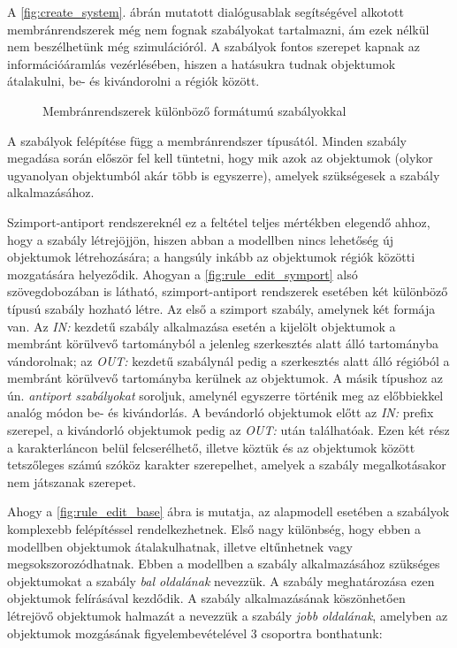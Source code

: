 A \ref{fig:create_system}. ábrán mutatott dialógusablak segítségével alkotott membránrendszerek még nem fognak szabályokat tartalmazni, ám ezek nélkül nem beszélhetünk még szimulációról.  A szabályok fontos szerepet kapnak az információáramlás vezérlésében, hiszen a hatásukra tudnak objektumok átalakulni, be- és kivándorolni a régiók között. 

\begin{figure}[H]
	\centering
	\vspace{5pt}
	\caption{Membránrendszerek különböző formátumú szabályokkal}
	\label{fig:rule_edits}
\end{figure}

 A szabályok felépítése függ a membránrendszer típusától. Minden szabály megadása során először fel kell tüntetni, hogy mik azok az objektumok (olykor ugyanolyan objektumból akár több is egyszerre), amelyek szükségesek a szabály alkalmazásához. 

Szimport-antiport rendszereknél ez a feltétel teljes mértékben elegendő ahhoz, hogy a szabály létrejöjjön, hiszen abban a modellben nincs lehetőség új objektumok létrehozására; a hangsúly inkább az objektumok régiók közötti mozgatására helyeződik. Ahogyan a \ref{fig:rule_edit_symport} alsó szövegdobozában is látható, szimport-antiport rendszerek esetében két különböző típusú szabály hozható létre. Az első a szimport szabály, amelynek két formája van. Az \textit{IN:} kezdetű szabály alkalmazása esetén a kijelölt objektumok a membránt körülvevő tartományból a jelenleg szerkesztés alatt álló tartományba vándorolnak; az \textit{OUT:} kezdetű szabálynál pedig a szerkesztés alatt álló régióból a membránt körülvevő tartományba kerülnek az objektumok. A másik típushoz az ún. \textit{antiport szabályokat}  soroljuk, amelynél egyszerre történik meg az előbbiekkel analóg módon be- és kivándorlás. A bevándorló objektumok előtt az \textit{IN:} prefix szerepel, a kivándorló objektumok pedig az \textit{OUT:} után találhatóak. Ezen két rész a karakterláncon belül felcserélhető, illetve köztük és az objektumok között tetszőleges számú szóköz karakter szerepelhet, amelyek a szabály megalkotásakor nem játszanak szerepet.

Ahogy a \ref{fig:rule_edit_base} ábra is mutatja, az alapmodell esetében a szabályok komplexebb felépítéssel rendelkezhetnek. Első nagy különbség, hogy ebben a modellben objektumok átalakulhatnak, illetve eltűnhetnek vagy megsokszorozódhatnak. Ebben a modellben a szabály alkalmazásához szükséges objektumokat a szabály \textit{bal oldalának} nevezzük. A szabály meghatározása ezen objektumok felírásával kezdődik. A szabály alkalmazásának köszönhetően létrejövő objektumok halmazát a nevezzük a szabály \textit{jobb oldalának}, amelyben az objektumok mozgásának figyelembevételével 3 csoportra bonthatunk:

